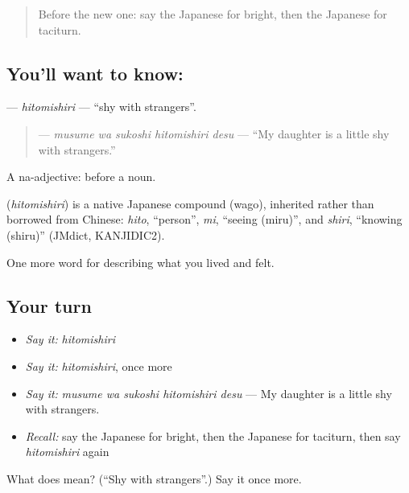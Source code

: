 \begin{quote}
Before the new one: say the Japanese for bright, then the Japanese for taciturn.
\end{quote}

\subsection*{You'll want to know: }
\textbf{} — \emph{hitomishiri} — \textquotedblleft{}shy with strangers\textquotedblright{}.

\begin{quote}
\textbf{  } — \emph{musume wa sukoshi hitomishiri desu} — \textquotedblleft{}My daughter is a little shy with strangers.\textquotedblright{}
\end{quote}

A na-adjective:  before a noun.

\begin{cousinweb}
\textbf{} (\emph{hitomishiri}) is a native Japanese compound (wago), inherited rather than borrowed from Chinese: \emph{hito}, \textquotedblleft{}person\textquotedblright{}, \emph{mi}, \textquotedblleft{}seeing (miru)\textquotedblright{}, and \emph{shiri}, \textquotedblleft{}knowing (shiru)\textquotedblright{} (JMdict, KANJIDIC2).
\end{cousinweb}

\begin{grammarlens}[title={What you've built}]
One more word for describing what you lived and felt.
\end{grammarlens}

\subsection*{Your turn}
\begin{itemize}
\raggedright
  \item \emph{Say it:} \emph{hitomishiri}
  \item \emph{Say it:} \emph{hitomishiri}, once more
  \item \emph{Say it:} \emph{musume wa sukoshi hitomishiri desu} — My daughter is a little shy with strangers.
  \item \emph{Recall:} say the Japanese for bright, then the Japanese for taciturn, then say \emph{hitomishiri} again
\end{itemize}

\begin{tcolorbox}[breakable,colback=teal!4,colframe=teal!35!black,title={Before you move on}]
What does  mean? (\textquotedblleft{}Shy with strangers\textquotedblright{}.) Say it once more.
\end{tcolorbox}
